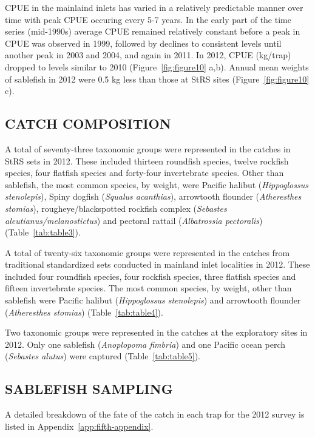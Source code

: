 \documentclass[12pt]{article}\usepackage[]{graphicx}\usepackage[]{color}
\begin{document}
CPUE in the mainlaind inlets has varied in a relatively predictable manner over time with peak CPUE occuring every 5-7 years. In the early part of the time series (mid-1990s) average CPUE remained relatively constant before a peak in CPUE was observed in 1999, followed by declines to consistent levels until another peak in 2003 and 2004, and again in 2011. In 2012, CPUE (kg/trap) dropped to levels similar to 2010 (Figure~\ref{fig:figure10} a,b). Annual mean weights of sablefish in 2012 were 0.5 kg less than those at StRS sites (Figure~\ref{fig:figure10} c).

\hypertarget{catch-composition}{%
\subsection{CATCH COMPOSITION}\label{catch-composition}}

A total of seventy-three taxonomic groups were represented in the catches in StRS sets in 2012. These included thirteen roundfish species, twelve rockfish species, four flatfish species and forty-four invertebrate species. Other than sablefish, the most common species, by weight, were Pacific halibut (\emph{Hippoglossus stenolepis}), Spiny dogfish (\emph{Squalus acanthias}), arrowtooth flounder (\emph{Atheresthes stomias}), rougheye/blackspotted rockfish complex (\emph{Sebastes aleutianus/melanostictus}) and pectoral rattail (\emph{Albatrossia pectoralis}) (Table~\ref{tab:table3}).

A total of twenty-six taxonomic groups were represented in the catches from traditional standardized sets conducted in mainland inlet localities in 2012. These included four roundfish species, four rockfish species, three flatfish species and fifteen invertebrate species. The most common species, by weight, other than sablefish were Pacific halibut (\emph{Hippoglossus stenolepis}) and arrowtooth flounder (\emph{Atheresthes stomias}) (Table~\ref{tab:table4}).

Two taxonomic groups were represented in the catches at the exploratory sites in 2012. Only one sablefish (\emph{Anoplopoma fimbria}) and one Pacific ocean perch (\emph{Sebastes alutus}) were captured (Table~\ref{tab:table5}).

\hypertarget{sablefish-sampling}{%
\subsection{SABLEFISH SAMPLING}\label{sablefish-sampling}}

A detailed breakdown of the fate of the catch in each trap for the 2012 survey is listed in Appendix~\ref{app:fifth-appendix}.
\end{document}
